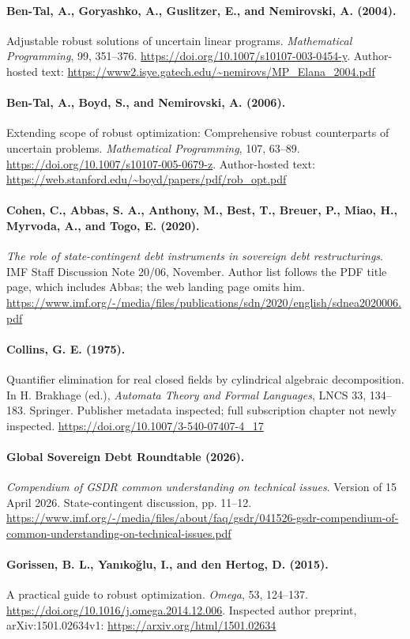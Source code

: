 \documentclass[11pt,a4paper]{article}
\begin{document}
\paragraph{Ben-Tal, A., Goryashko, A., Guslitzer, E., and Nemirovski, A. (2004).}
Adjustable robust solutions of uncertain linear programs. \emph{Mathematical Programming}, 99, 351--376. \url{https://doi.org/10.1007/s10107-003-0454-y}. Author-hosted text: \url{https://www2.isye.gatech.edu/~nemirovs/MP_Elana_2004.pdf}
\paragraph{Ben-Tal, A., Boyd, S., and Nemirovski, A. (2006).}
Extending scope of robust optimization: Comprehensive robust counterparts of uncertain problems. \emph{Mathematical Programming}, 107, 63--89. \url{https://doi.org/10.1007/s10107-005-0679-z}. Author-hosted text: \url{https://web.stanford.edu/~boyd/papers/pdf/rob_opt.pdf}
\paragraph{Cohen, C., Abbas, S. A., Anthony, M., Best, T., Breuer, P., Miao, H., Myrvoda, A., and Togo, E. (2020).}
\emph{The role of state-contingent debt instruments in sovereign debt restructurings}. IMF Staff Discussion Note 20/06, November. Author list follows the PDF title page, which includes Abbas; the web landing page omits him. \url{https://www.imf.org/-/media/files/publications/sdn/2020/english/sdnea2020006.pdf}
\paragraph{Collins, G. E. (1975).}
Quantifier elimination for real closed fields by cylindrical algebraic decomposition. In H. Brakhage (ed.), \emph{Automata Theory and Formal Languages}, LNCS 33, 134--183. Springer. Publisher metadata inspected; full subscription chapter not newly inspected. \url{https://doi.org/10.1007/3-540-07407-4_17}
\paragraph{Global Sovereign Debt Roundtable (2026).}
\emph{Compendium of GSDR common understanding on technical issues}. Version of 15 April 2026. State-contingent discussion, pp. 11--12. \url{https://www.imf.org/-/media/files/about/faq/gsdr/041526-gsdr-compendium-of-common-understanding-on-technical-issues.pdf}
\paragraph{Gorissen, B. L., Yan\i ko\u glu, I., and den Hertog, D. (2015).}
A practical guide to robust optimization. \emph{Omega}, 53, 124--137. \url{https://doi.org/10.1016/j.omega.2014.12.006}. Inspected author preprint, arXiv:1501.02634v1: \url{https://arxiv.org/html/1501.02634}
\end{document}
